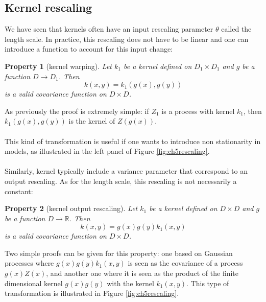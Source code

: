 \documentclass[twoside,openright]{report}
\newtheorem{property}{Property}
\begin{document}
\subsection{Kernel rescaling}
We have seen that kernels often have an input rescaling parameter $\theta$ called the length scale. In practice, this rescaling does not have to be linear and one can introduce a function to account for this input change:
\begin{property}[kernel warping]
    Let $k_1$ be a kernel defined on $D_1 \times D_1$ and $g$ be a function $D \rightarrow D_1$. Then 
    \begin{equation}
        k(x,y) = k_1(g(x),g(y))
    \end{equation}
    is a valid covariance function on $D \times D$.
\end{property}
As previously the proof is extremely simple: if $Z_1$ is a process with kernel $k_1$, then $k_1(g(x),g(y))$ is the kernel of $Z(g(x))$.

\paragraph{}
This kind of transformation is useful if one wants to introduce non stationarity in models, as illustrated in the left panel of Figure \ref{fig:ch5rescaling}.

\paragraph{}
Similarly, kernel typically include a variance parameter that correspond to an output rescaling. As for the length scale, this rescaling is not necessarily a constant:
\begin{property}[kernel output rescaling]
    Let $k_1$ be a kernel defined on $D \times D$ and $g$ be a function $D \rightarrow \mathds{R}$. Then 
    \begin{equation}
        k(x,y) = g(x)g(y)k_1(x,y)
    \end{equation}
    is a valid covariance function on $D \times D$.
\end{property}
Two simple proofs can be given for this property: one based on Gaussian processes where $g(x)g(y)k_1(x,y)$ is seen as the covariance of a process $g(x)Z(x)$, and another one where it is seen as the product of the finite dimensional kernel $g(x)g(y)$ with the kernel $k_1(x,y)$. This type of transformation is illustrated in Figure \ref{fig:ch5rescaling}.
\end{document}
